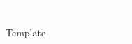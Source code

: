 \documentclass[9 pt]{beamer}
\begin{document}

\begin{frame}{1}
\textcolor{white}
{
HTML \hspace{50mm} CSS
}
\end{frame}

\begin{frame}{Template}
\textcolor{white}
{
This is white text.
}
\end{frame}
\end{document}

